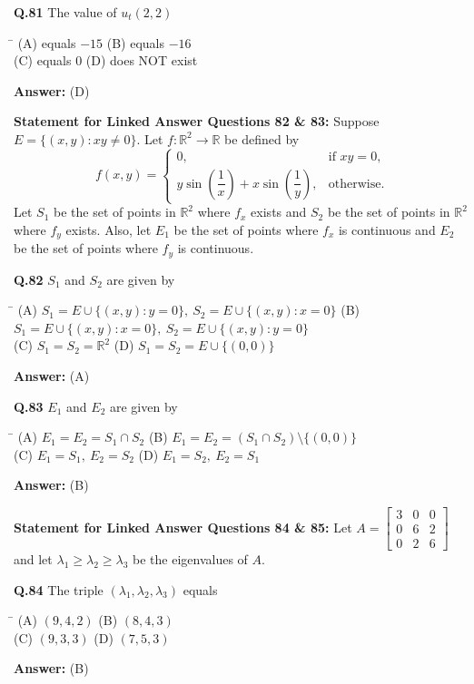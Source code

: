\documentclass[11pt,a4paper]{article}
\newcommand{\optsfourA}[4]{%
  \begin{tabbing}
    \hspace{0.48\linewidth}\=\kill
    (A) #1 \> (B) #2 \\[2pt]
    (C) #3 \> (D) #4
  \end{tabbing}%
}
\newcommand{\ans}[1]{\textbf{Answer:} #1\par\medskip}
\begin{document}
\textbf{Q.81} The value of $u_t(2, 2)$
\optsfourA{equals $-15$}{equals $-16$}{equals $0$}{does NOT exist}
\ans{(D)}

\medskip
\textbf{Statement for Linked Answer Questions 82 \& 83:}
Suppose $E = \{(x, y) : xy \ne 0\}$. Let $f : \mathbb{R}^2 \to \mathbb{R}$ be defined by
\[
  f(x, y) = \begin{cases} 0, & \text{if } xy = 0, \\ y\sin\!\left(\dfrac{1}{x}\right) + x\sin\!\left(\dfrac{1}{y}\right), & \text{otherwise.} \end{cases}
\]
Let $S_1$ be the set of points in $\mathbb{R}^2$ where $f_x$ exists and $S_2$ be the set of points in $\mathbb{R}^2$ where $f_y$ exists. Also, let $E_1$ be the set of points where $f_x$ is continuous and $E_2$ be the set of points where $f_y$ is continuous.

\textbf{Q.82} $S_1$ and $S_2$ are given by
\optsfourA{$S_1 = E \cup \{(x,y) : y = 0\},\ S_2 = E \cup \{(x,y) : x = 0\}$}{$S_1 = E \cup \{(x,y) : x = 0\},\ S_2 = E \cup \{(x,y) : y = 0\}$}{$S_1 = S_2 = \mathbb{R}^2$}{$S_1 = S_2 = E \cup \{(0, 0)\}$}
\ans{(A)}

\textbf{Q.83} $E_1$ and $E_2$ are given by
\optsfourA{$E_1 = E_2 = S_1 \cap S_2$}{$E_1 = E_2 = (S_1 \cap S_2) \setminus \{(0, 0)\}$}{$E_1 = S_1,\ E_2 = S_2$}{$E_1 = S_2,\ E_2 = S_1$}
\ans{(B)}

\medskip
\textbf{Statement for Linked Answer Questions 84 \& 85:}
Let $A = \begin{bmatrix} 3 & 0 & 0 \\ 0 & 6 & 2 \\ 0 & 2 & 6 \end{bmatrix}$ and let $\lambda_1 \ge \lambda_2 \ge \lambda_3$ be the eigenvalues of $A$.

\textbf{Q.84} The triple $(\lambda_1, \lambda_2, \lambda_3)$ equals
\optsfourA{$(9, 4, 2)$}{$(8, 4, 3)$}{$(9, 3, 3)$}{$(7, 5, 3)$}
\ans{(B)}
\end{document}
